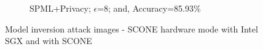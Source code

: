 \begin{figure}
\begin{subfigure}{.325\textwidth}
         \vspace{-8em}
         \caption{SPML+Privacy; $\epsilon$=8; and, Accuracy=85.93\%}
         \label{default}
     \end{subfigure}
        \caption{Model inversion attack images - SCONE hardware mode with Intel SGX and with SCONE}
        \label{default}
\end{figure}